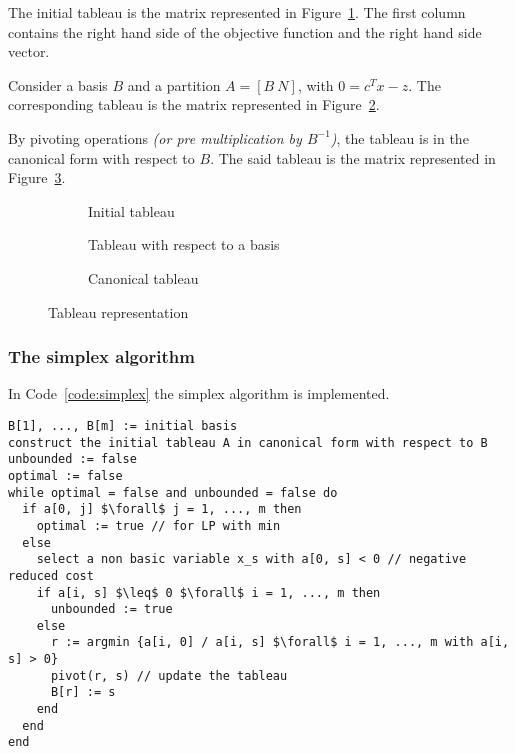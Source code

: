 \documentclass[english]{article}
\begin{document}
The initial tableau is the matrix represented in Figure~\ref{subfig:tableau-initial}.
The first column contains the right hand side of the objective function and the right hand side vector.

Consider a basis \(B\) and a partition \(A = \left[ B \ N \right]\), with \(0 = c^T x - z\).
The corresponding tableau is the matrix represented in Figure~\ref{subfig:tableau-basis}.

By pivoting operations \textit{(or pre multiplication by \(B^{-1}\))}, the tableau is in the canonical form with respect to \(B\).
The said tableau is the matrix represented in Figure~\ref{subfig:tableau-canonical}.

\begin{figure}[htbp]
  \centering
  \bigskip
  \begin{subfigure}[t]{0.99\textwidth}
    \centering
    \bigskip
    \caption{Initial tableau}
    \label{subfig:tableau-initial}
    \bigskip
  \end{subfigure}
  \bigskip
  \begin{subfigure}[b]{0.515\textwidth}
    \centering
    \bigskip
    \caption{Tableau with respect to a basis}
    \label{subfig:tableau-basis}
    \bigskip
  \end{subfigure}
  \begin{subfigure}[b]{0.475\textwidth}
    \centering
    \bigskip
    \caption{Canonical tableau}
    \label{subfig:tableau-canonical}
    \bigskip
  \end{subfigure}
  \caption{Tableau representation}
  \label{fig:tableau-representations}
  \bigskip
\end{figure}

\subsubsection{The simplex algorithm}

In Code~\ref{code:simplex} the simplex algorithm is implemented.

\begin{lstlisting}[language=pseudocode, caption={The simplex algorithm}, label={code:simplex}]
B[1], ..., B[m] := initial basis
construct the initial tableau A in canonical form with respect to B
unbounded := false
optimal := false
while optimal = false and unbounded = false do
  if a[0, j] $\forall$ j = 1, ..., m then
    optimal := true // for LP with min
  else
    select a non basic variable x_s with a[0, s] < 0 // negative reduced cost
    if a[i, s] $\leq$ 0 $\forall$ i = 1, ..., m then
      unbounded := true
    else
      r := argmin {a[i, 0] / a[i, s] $\forall$ i = 1, ..., m with a[i, s] > 0}
      pivot(r, s) // update the tableau
      B[r] := s
    end
  end
end
\end{lstlisting}
\end{document}
